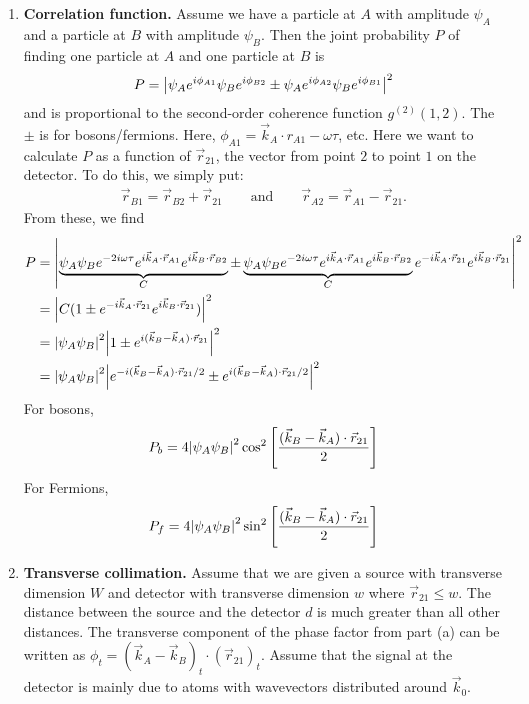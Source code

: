 \documentclass{article}
\theoremstyle{definition}
\newcommand{\f}[2]{\frac{#1}{#2}}
\newcommand{\lb}{\left[}
\newcommand{\rb}{\right]}
\begin{document}
\begin{enumerate}[label=(\alph*)]

\item \textbf{Correlation function.} Assume we have a particle at $A$ with amplitude $\psi_A$ and a particle at $B$ with amplitude $\psi_B$. Then the joint probability $P$ of finding one particle at $A$ and one particle at $B$ is 
\begin{align*}
P = \abs{\psi_A e^{i\phi_{A1}}   \psi_B  e^{i\phi_{B2}} \pm \psi_A e^{i\phi_{A2}} \psi_B e^{i\phi_{B1}} }^2
\end{align*}
and is proportional to the second-order coherence function $g^{(2)}(1,2)$. The $\pm$ is for bosons/fermions. Here, $\phi_{A1} = \vec{k}_A \cdot r_{A1}  -\omega \tau$, etc. Here we want to calculate $P$ as a function of $\vec{r}_{21}$, the vector from point $2$ to point $1$ on the detector. To do this, we simply put:
\begin{align*}
\vec{r}_{B1} =  \vec{r}_{B2} + \vec{r}_{21} \quad\quad \text{and} \quad\quad \vec{r}_{A2} = \vec{r}_{A1} - \vec{r}_{21}. 
\end{align*}
From these, we find 
\begin{align*}
P 
&= \abs{  \underbrace{ \psi_A \psi_B e^{-2i\omega \tau} e^{i\vec{k}_A \cdot \vec{r}_{A1}}  e^{i\vec{k}_B \cdot \vec{r}_{B2}} }_{C}
\pm
\underbrace{\psi_A \psi_B e^{-2i\omega\tau} e^{i\vec{k}_A \cdot \vec{r}_{A1} } e^{i\vec{k}_B\cdot \vec{r}_{B2}}}_{C}
e^{-i\vec{k}_A \cdot \vec{r}_{21}} e^{i\vec{k}_B \cdot \vec{r}_{21} } 
}^2 \\
&= \abs{C(1 \pm e^{-i\vec{k}_A \cdot \vec{r}_{21}} e^{i\vec{k}_B \cdot \vec{r}_{21} }  )}^2 \\ 
&= \abs{\psi_A \psi_B}^2 \abs{1 \pm e^{i(\vec{k}_B - \vec{k}_A ) \cdot \vec{r}_{21}   }}^2 \\
&= \abs{\psi_A \psi_B}^2  \abs{ e^{-i( \vec{k}_B - \vec{k}_A  )\cdot \vec{r}_{21} /2 } \pm  
e^{i( \vec{k}_B - \vec{k}_A  )\cdot \vec{r}_{21} /2 }  }^2
\end{align*}
For bosons, 
\begin{align*}
P_b = 4 \abs{\psi_A \psi_B}^2 
\cos^2 \lb \f{(\vec{k}_B - \vec{k}_A )\cdot \vec{r}_{21}}{2}  \rb
\end{align*}
For Fermions, 
\begin{align*}
P_f = 4 \abs{\psi_A \psi_B}^2 \sin^2 \lb \f{(\vec{k}_B - \vec{k}_A )\cdot \vec{r}_{21}}{2}  \rb
\end{align*}

\item \textbf{Transverse collimation.} Assume that we are given a source with transverse dimension $W$ and detector with transverse dimension $w$ where $\vec{r}_{21} \leq w$. The distance between the source and the detector $d$ is much greater than all other distances. The transverse component of the phase factor from part (a) can be written as $\phi_t = (\vec{k}_A - \vec{k}_B)_t \cdot (\vec{r}_{21})_t$. Assume that the signal at
the detector is mainly due to atoms with wavevectors distributed around $\vec{k}_0$. \\


\end{enumerate}
\end{document}
